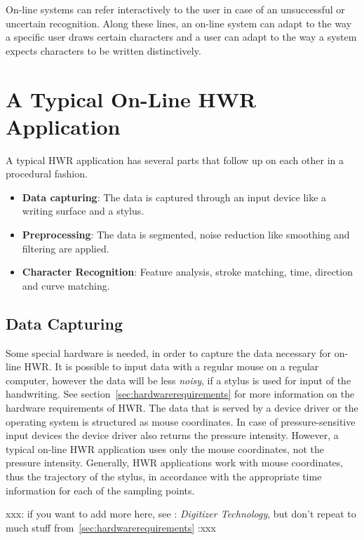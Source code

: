 On-line systems can refer interactively to the user in case of an unsuccessful 
or uncertain recognition. Along these lines, an on-line system can adapt to 
the way a specific user draws certain characters and a user can adapt to the
way a system expects characters to be written distinctively.

\section{A Typical On-Line HWR Application}
\label{sec:atypicalonlinehwrapplication}

A typical HWR application has several parts that follow up on each other in a
procedural fashion.
\begin{itemize}
\item \textbf{Data capturing}: The data is captured through an input device 
  like a writing surface and a stylus.
\item \textbf{Preprocessing}: The data is segmented, noise reduction like smoothing and filtering are applied.
\item \textbf{Character Recognition}: Feature analysis, stroke matching, time, 
direction and curve matching.
\end{itemize}

\subsection{Data Capturing}
\label{sec:datacapturing}

Some special hardware is needed, in order to capture the data necessary 
for on-line HWR. It is possible to input data with a regular mouse on 
a regular computer, however the data will be less \emph{noisy}, 
if a stylus is used for input of the handwriting. 
See section~\ref{sec:hardwarerequirements} for more information on the hardware 
requirements of HWR. The data that is served by a device driver or the operating
system is structured as mouse coordinates. In case of pressure-sensitive input 
devices the device driver also returns the pressure intensity. 
However, a typical on-line HWR application uses only the mouse coordinates,
not the pressure intensity. Generally, HWR applications work with mouse
coordinates, thus the trajectory of the stylus, in accordance with the 
appropriate time information for each of the sampling points.

xxx: 
if you want to add more here, see :
\emph{Digitizer Technology}, but don't repeat to much stuff 
from~\ref{sec:hardwarerequirements}
:xxx

